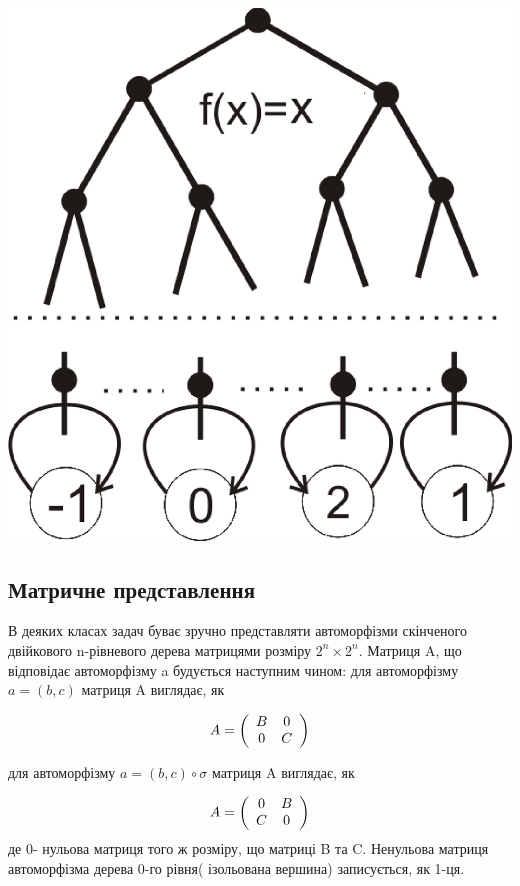 \documentclass[a4paper,12pt]{article} \usepackage{a4wide}
\numberwithin{equation}{subsection}
\begin{document}
\begin{center}
\includegraphics[scale=0.5]{Typeid.eps}
\end{center}

\newpage

 \subsection{Матричне представлення}
   В деяких класах задач буває зручно представляти автоморфізми скінченого двійкового n-рівневого дерева матрицями розміру $2^n\times 2^n$.
   Матриця A, що відповідає автоморфізму a будується наступним чином:
  для автоморфізму $a=(b,c)$ матриця A виглядає, як



\[
A = \left( {\begin{array}{*{20}c}
   B & 0  \\
   0 & C  \\
\end{array}} \right)
\]


  для автоморфізму $a=(b,c)\circ \sigma$ матриця A виглядає, як


\[
A = \left( {\begin{array}{*{20}c}
   0 & B  \\
   C & 0  \\
\end{array}} \right)
\]
 де 0- нульова матриця того ж розміру, що матриці B та C.
 Ненульова матриця автоморфізма дерева 0-го рівня( ізольована вершина) записується, як 1-ця.
\end{document}

